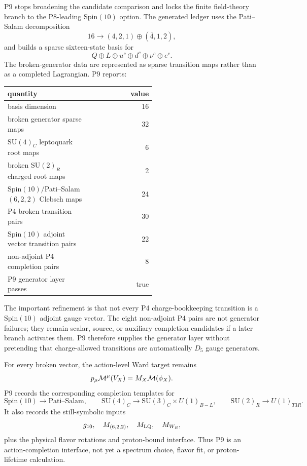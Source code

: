 \documentclass[11pt]{article}
\newcommand{\SU}{\mathrm{SU}}
\newcommand{\Spin}{\mathrm{Spin}}
\newcommand{\uc}{u^c}
\newcommand{\dc}{d^c}
\newcommand{\nuc}{\nu^c}
\newcommand{\ec}{e^c}
\begin{document}
P9 stops broadening the candidate comparison and locks the finite
field-theory branch to the P8-leading $\Spin(10)$ option.  The generated
ledger uses the Pati--Salam decomposition
\begin{equation}
  16
  \longrightarrow
  (4,2,1)\oplus(\bar 4,1,2),
\end{equation}
and builds a sparse sixteen-state basis for
\begin{equation}
  Q\oplus L\oplus\uc\oplus\dc\oplus\nuc\oplus\ec .
\end{equation}
The broken-generator data are represented as sparse transition maps rather
than as a completed Lagrangian.  P9 reports:
\begin{center}
\small
\begin{tabular}{p{0.58\linewidth}r}
\toprule
quantity & value\\
\midrule
basis dimension & 16\\
broken generator sparse maps & 32\\
$\SU(4)_C$ leptoquark root maps & 6\\
broken $\SU(2)_R$ charged root maps & 2\\
$\Spin(10)/$Pati--Salam $(6,2,2)$ Clebsch maps & 24\\
P4 broken transition pairs & 30\\
$\Spin(10)$ adjoint vector transition pairs & 22\\
non-adjoint P4 completion pairs & 8\\
P9 generator layer passes & true\\
\bottomrule
\end{tabular}
\end{center}

The important refinement is that not every P4 charge-bookkeeping transition
is a $\Spin(10)$ adjoint gauge vector.  The eight non-adjoint P4 pairs are
not generator failures; they remain scalar, source, or auxiliary completion
candidates if a later branch activates them.  P9 therefore supplies the
generator layer without pretending that charge-allowed transitions are
automatically $D_5$ gauge generators.

For every broken vector, the action-level Ward target remains
\begin{equation}
  p_\mu{\cal M}^\mu(V_X)=M_X{\cal M}(\phi_X).
\end{equation}
P9 records the corresponding completion templates for
\begin{equation}
  \Spin(10)\to \text{Pati--Salam},\qquad
  \SU(4)_C\to\SU(3)_C\times U(1)_{B-L},\qquad
  \SU(2)_R\to U(1)_{T3R}.
\end{equation}
It also records the still-symbolic inputs
\begin{equation}
  g_{10},\quad M_{(6,2,2)},\quad M_{\rm LQ},\quad M_{W_R},
\end{equation}
plus the physical flavor rotations and proton-bound interface.  Thus P9 is
an action-completion interface, not yet a spectrum choice, flavor fit, or
proton-lifetime calculation.
\end{document}
